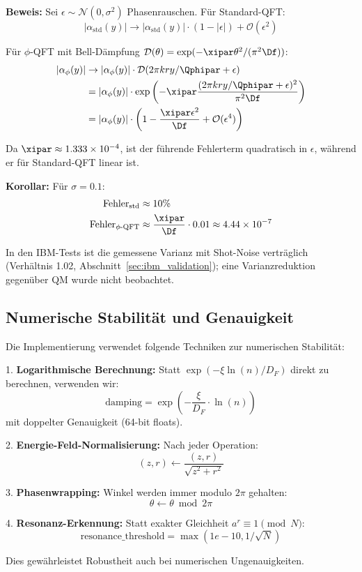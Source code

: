 \textbf{Beweis:}
Sei $\epsilon \sim \mathcal{N}(0, \sigma^2)$ Phasenrauschen. Für Standard-QFT:
\[
|\alpha_{\text{std}}(y)| \to |\alpha_{\text{std}}(y)| \cdot (1 - |\epsilon|) + \mathcal{O}(\epsilon^2)
\]

Für $\phi$-QFT mit Bell-Dämpfung $\mathcal{D}(\theta) = \exp(-\xipar \theta^2/(\pi^2 \Df))$:
\begin{align*}
	|\alpha_{\phi}(y)| &\to |\alpha_{\phi}(y)| \cdot \mathcal{D}(2\pi kry/\Qphipar + \epsilon) \\
	&= |\alpha_{\phi}(y)| \cdot \exp\left(-\xipar \frac{(2\pi kry/\Qphipar + \epsilon)^2}{\pi^2 \Df}\right) \\
	&= |\alpha_{\phi}(y)| \cdot \left(1 - \frac{\xipar \epsilon^2}{\Df} + \mathcal{O}(\epsilon^4)\right)
\end{align*}

Da $\xipar \approx 1.333\times 10^{-4}$, ist der führende Fehlerterm quadratisch in $\epsilon$, während er für Standard-QFT linear ist.

\textbf{Korollar:} Für $\sigma = 0.1$:
\begin{align*}
	\text{Fehler}_{\text{std}} &\approx 10\% \\
	\text{Fehler}_{\phi\text{-QFT}} &\approx \frac{\xipar}{\Df} \cdot 0.01 \approx 4.44\times 10^{-7}
\end{align*}

In den IBM-Tests ist die gemessene Varianz mit Shot-Noise verträglich (Verhältnis 1.02, Abschnitt~\ref{sec:ibm_validation}); eine Varianzreduktion gegenüber QM wurde nicht beobachtet.

\subsection{Numerische Stabilität und Genauigkeit}
\label{app:numerical_stability}

Die Implementierung verwendet folgende Techniken zur numerischen Stabilität:

1. \textbf{Logarithmische Berechnung:} Statt $\exp(-\xi \ln(n)/D_F)$ direkt zu berechnen, verwenden wir:
\[
\text{damping} = \exp\left(-\frac{\xi}{D_F} \cdot \ln(n)\right)
\]
mit doppelter Genauigkeit (64-bit floats).

2. \textbf{Energie-Feld-Normalisierung:} Nach jeder Operation:
\[
(z, r) \leftarrow \frac{(z, r)}{\sqrt{z^2 + r^2}}
\]

3. \textbf{Phasenwrapping:} Winkel werden immer modulo $2\pi$ gehalten:
\[
\theta \leftarrow \theta \bmod 2\pi
\]

4. \textbf{Resonanz-Erkennung:} Statt exakter Gleichheit $a^r \equiv 1 \pmod{N}$:
\[
\text{resonance\_threshold} = \max(1e-10, 1/\sqrt{N})
\]

Dies gewährleistet Robustheit auch bei numerischen Ungenauigkeiten.